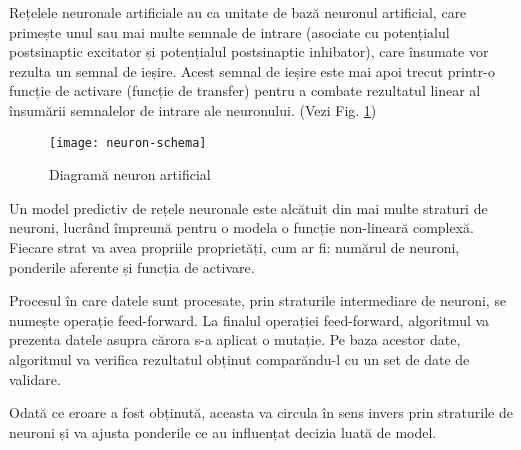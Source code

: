	
	Rețelele neuronale artificiale au ca unitate de bază neuronul artificial, care primește unul sau mai multe semnale de intrare (asociate cu potențialul postsinaptic excitator și potențialul postsinaptic inhibator), care însumate vor rezulta un semnal de ieșire. Acest semnal de ieșire este mai apoi trecut printr-o funcție de activare (funcție de transfer) pentru a combate rezultatul linear al însumării semnalelor de intrare ale neuronului. (Vezi Fig. \ref{fig:neuron-schema})
	
	\begin{figure}[H]
		\texttt{[image: neuron-schema]}  
		\caption{\label{fig:neuron-schema} Diagramă neuron artificial 
		\protect 
		\cite{ann}}
	\end{figure}
	
	
	Un model predictiv de rețele neuronale este alcătuit din mai multe straturi de neuroni, lucrând împreună pentru o modela o funcție non-lineară complexă.
	Fiecare strat va avea propriile proprietăți, cum ar fi: numărul de neuroni, ponderile aferente și funcția de activare.
	
	Procesul în care datele sunt procesate, prin straturile intermediare de neuroni, se numește operație feed-forward. La finalul operației feed-forward, algoritmul va prezenta datele asupra cărora s-a aplicat o mutație. Pe baza acestor date, algoritmul va verifica rezultatul obținut comparăndu-l cu un set de date de validare. 
	
	Odată ce eroare a fost obținută, aceasta va circula în sens invers prin straturile de neuroni și va ajusta ponderile ce au influențat decizia luată de model.
	
	

